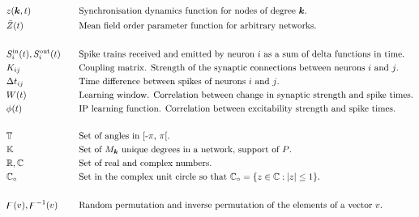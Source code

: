 \begin{alignat*}{2}
& z({\boldsymbol{k}}, t) &&\text{Synchronisation dynamics function for nodes of degree ${\boldsymbol{k}}$.}\\
& \bar{Z}(t) &&\text{Mean field order parameter function for arbitrary networks.}\\ \\
& S_i^{\rm in}(t), S_i^{\rm out}(t)\quad &&\text{Spike trains received and emitted by neuron $i$ as a sum of delta functions in time.}\\ 
& K_{ij} &&\text{Coupling matrix. Strength of the synaptic connections between neurons $i$ and $j$.}\\
& \Delta t_{ij} &&\text{Time difference between spikes of neurons $i$ and $j$.}\\
& W(t) &&\text{Learning window. Correlation between change in synaptic strength and spike times.}\\ 
& \phi(t) &&\text{IP learning function. Correlation between excitability strength and spike times.}\\ \\
& {\mathbb{T}} &&\text{Set of angles in [-$\pi$, $\pi$[.}\\
& {\mathbb{K}} &&\text{Set of $M_{{\boldsymbol{k}}}$ unique degrees in a network, support of $P$.}\\ 
& {\mathbb{R}}, {\mathbb{C}} &&\text{Set of real and complex numbers.}\\ 
&  \mathbb{C}_\circ && \text{Set in the complex unit circle so that $\mathbb{C}_\circ = \{ z \in {\mathbb{C}} : \: \rvert z \rvert \leq 1 \} $.} \\ \\
& {\digamma}(v), {\digamma^{-1}}(v) &&\text{Random permutation and inverse permutation of the elements of a vector $v$.}\\ 
\end{alignat*}
